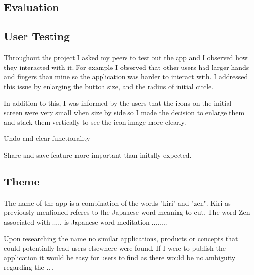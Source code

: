 \documentclass[11pt]{article}
\begin{document}
        \subsection{Evaluation}
            
                \paragraph{}

    \subsection{User Testing}
    
           \paragraph{} Throughout the project I asked my peers to test out the app and I observed how they interacted with it. For example I observed that other users had larger hands and fingers than mine so the application was harder to interact with. I addressed this issue by enlarging the button size, and the radius of initial circle. 
           
           In addition to this, I was informed by the users that the icons on the initial screen were very small when size by side so I made the decision to enlarge them and stack them vertically to see the icon image more clearly. 
           
           Undo and clear functionality
           
           Share and save feature more important than initally expected.
        


    
    \subsection{Theme}
        
        \paragraph{}
        The name of the app is a combination of the words "kiri" and "zen". Kiri as previously mentioned referes to the Japanese word meaning to cut. The word Zen  associated with ..... is Japanese word meditation ........ 
        
        Upon researching the name no similar applications, products or concepts that could potentially lead users elsewhere were found. If I were to publish the application it would be easy for users to find as there would be no ambiguity regarding the ....
        
\end{document}
